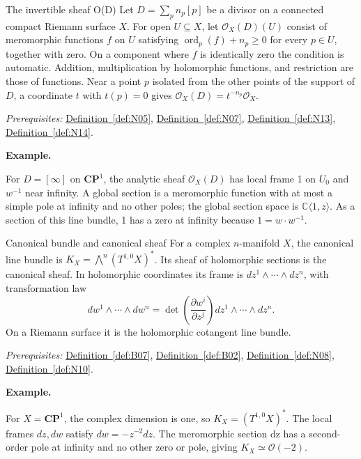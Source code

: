 \documentclass[11pt]{article}
\makeatletter
\newcommand{\C}{\mathbb C}
\newcounter{definition}
\newcommand{\CP}{\mathbf{CP}}
\newcommand{\exampleheading}{\par\medskip\textbf{Example.}\par\smallskip}
\newcommand{\currentdefinition}[1]{\protected@edef\@currentlabel{#1}}
\makeatother
\begin{document}
\begin{definitionbox}{The invertible sheaf O(D)}
\currentdefinition{\thedefinition}
\label{def:N18}
Let $D=\sum_p n_p[p]$ be a divisor on a connected compact Riemann surface $X$. For open $U\subseteq X$, let $\mathcal O_X(D)(U)$ consist of meromorphic functions $f$ on $U$ satisfying $\operatorname{ord}_p(f)+n_p\ge0$ for every $p\in U$, together with zero. On a component where $f$ is identically zero the condition is automatic. Addition, multiplication by holomorphic functions, and restriction are those of functions. Near a point $p$ isolated from the other points of the support of $D$, a coordinate $t$ with $t(p)=0$ gives $\mathcal O_X(D)=t^{-n_p}\mathcal O_X$.

\smallskip
\textit{Prerequisites:} \hyperref[def:N05]{Definition~\ref*{def:N05}}, \hyperref[def:N07]{Definition~\ref*{def:N07}}, \hyperref[def:N13]{Definition~\ref*{def:N13}}, \hyperref[def:N14]{Definition~\ref*{def:N14}}.

\exampleheading
For $D=[\infty]$ on $\CP^1$, the analytic sheaf $\mathcal O_X(D)$ has local frame 1 on $U_0$ and $w^{-1}$ near infinity. A global section is a meromorphic function with at most a simple pole at infinity and no other poles; the global section space is $\C\langle1,z\rangle$. As a section of this line bundle, 1 has a zero at infinity because $1=w\cdot w^{-1}$.
\end{definitionbox}

\begin{definitionbox}{Canonical bundle and canonical sheaf}
\currentdefinition{\thedefinition}
\label{def:N19}
For a complex $n$-manifold $X$, the canonical line bundle is $K_X=\bigwedge^n(T^{1,0}X)^*$. Its sheaf of holomorphic sections is the canonical sheaf. In holomorphic coordinates its frame is $dz^1\wedge\cdots\wedge dz^n$, with transformation law
\[dw^1\wedge\cdots\wedge dw^n=\det\left(\frac{\partial w^i}{\partial z^j}\right)dz^1\wedge\cdots\wedge dz^n.\]
On a Riemann surface it is the holomorphic cotangent line bundle.

\smallskip
\textit{Prerequisites:} \hyperref[def:B07]{Definition~\ref*{def:B07}}, \hyperref[def:B02]{Definition~\ref*{def:B02}}, \hyperref[def:N08]{Definition~\ref*{def:N08}}, \hyperref[def:N10]{Definition~\ref*{def:N10}}.

\exampleheading
For $X=\CP^1$, the complex dimension is one, so $K_X=(T^{1,0}X)^*$. The local frames $dz,dw$ satisfy $dw=-z^{-2}dz$. The meromorphic section dz has a second-order pole at infinity and no other zero or pole, giving $K_X\simeq\mathcal O(-2)$.
\end{definitionbox}
\end{document}
